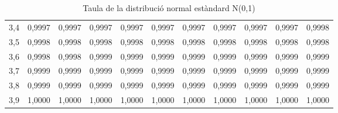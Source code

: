 \begin{table}[h!]
\begin{scriptsize}
\begin{tabular}{c|cccccccccc}
        3,4 & 0,9997 & 0,9997 & 0,9997 & 0,9997 & 0,9997 & 0,9997 & 0,9997 & 0,9997 & 0,9997 & 0,9998 \\
        3,5 & 0,9998 & 0,9998 & 0,9998 & 0,9998 & 0,9998 & 0,9998 & 0,9998 & 0,9998 & 0,9998 & 0,9998 \\
        3,6 & 0,9998 & 0,9998 & 0,9999 & 0,9999 & 0,9999 & 0,9999 & 0,9999 & 0,9999 & 0,9999 & 0,9999 \\
        3,7 & 0,9999 & 0,9999 & 0,9999 & 0,9999 & 0,9999 & 0,9999 & 0,9999 & 0,9999 & 0,9999 & 0,9999 \\
        3,8 & 0,9999 & 0,9999 & 0,9999 & 0,9999 & 0,9999 & 0,9999 & 0,9999 & 0,9999 & 0,9999 & 0,9999 \\
        3,9 & 1,0000 & 1,0000 & 1,0000 & 1,0000 & 1,0000 & 1,0000 & 1,0000 & 1,0000 & 1,0000 & 1,0000 \\
        \hline
    \end{tabular}
    \end{scriptsize}
    \caption{Taula de la distribució normal estàndard N(0,1)}
    \label{tau-normal}
\end{table}
